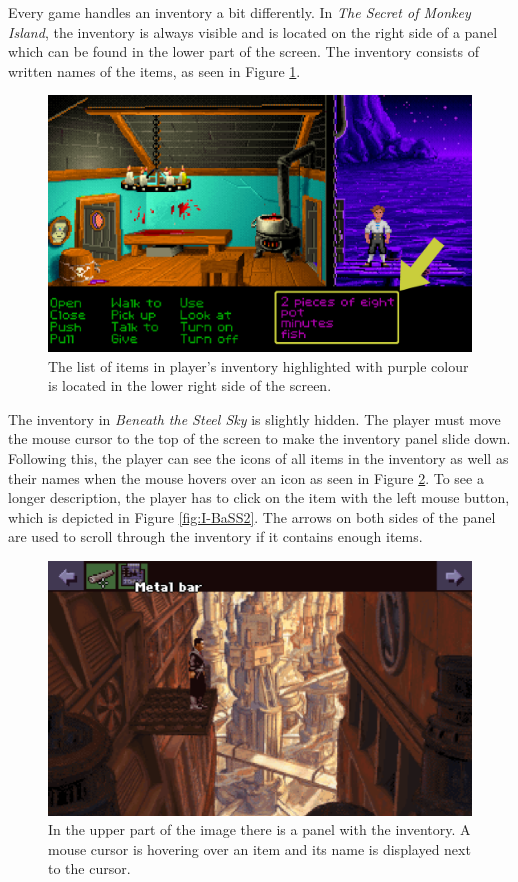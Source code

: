 Every game handles an inventory a bit differently. In \textit{The Secret of Monkey Island}, the inventory is always visible and is located on the right side of a panel which can be found in the lower part of the screen. The inventory consists of written names of the items, as seen in Figure \ref{fig:I-TSoMI}.
\begin{figure}[H]
\centering
\includegraphics[width=.8\linewidth]{img/I-TSoMI.png}
\caption{The list of items in player's inventory highlighted with purple colour is located in the lower right side of the screen.}
\label{fig:I-TSoMI}
\end{figure}

The inventory in \textit{Beneath the Steel Sky} is slightly hidden. The player must move the mouse cursor to the top of the screen to make the inventory panel slide down. Following this, the player can see the icons of all items in the inventory as well as their names when the mouse hovers over an icon as seen in Figure \ref{fig:I-BaSS1}. To see a longer description, the player has to click on the item with the left mouse button, which is depicted in Figure \ref{fig:I-BaSS2}. The arrows on both sides of the panel are used to scroll through the inventory if it contains enough items.
\begin{figure}[H]
\centering
\includegraphics[width=.8\linewidth]{img/I-BaSS1.png}
\caption{In the upper part of the image there is a panel with the inventory. A mouse cursor is hovering over an item and its name is displayed next to the cursor.}
\label{fig:I-BaSS1}
\end{figure}

